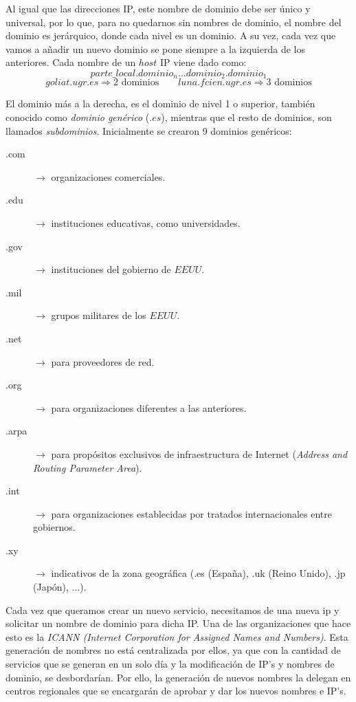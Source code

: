 \documentclass[10pt,a4paper,spanish]{report}
\begin{document}
Al igual que las direcciones IP, este nombre de dominio debe ser único y universal, por lo que, para no quedarnos sin nombres de dominio, el nombre del dominio es jerárquico, donde cada nivel es un dominio. A su vez, cada vez que vamos a añadir un nuevo dominio se pone siempre a la izquierda de los anteriores. Cada nombre de un $host$ IP viene dado como:
\begin{displaymath}
    parte\_local.dominio_n\ldots dominio_2.dominio_1
 \end{displaymath} 
\begin{displaymath} 
   goliat.ugr.es \Rightarrow \text{2 dominios} \qquad luna.fcien.ugr.es \Rightarrow \text{3 dominios}
\end{displaymath} 

El dominio más a la derecha, es el dominio de nivel 1 o superior, también conocido como \textit{\textcolor{tema2}{dominio genérico}} ($.es$), mientras que el resto de dominios, son llamados \textit{\textcolor{tema2}{subdominios}}. Inicialmente se crearon 9 dominios genéricos:
\begin{description}
  \item[.com] $\rightarrow$ organizaciones comerciales.
  \item[.edu] $\rightarrow$ instituciones educativas, como universidades.
  \item[.gov] $\rightarrow$ instituciones del gobierno de $EEUU$.
  \item[.mil] $\rightarrow$ grupos militares de los $EEUU$.
  \item[.net] $\rightarrow$ para proveedores de red.
  \item[.org] $\rightarrow$ para organizaciones diferentes a las anteriores.
  \item[.arpa] $\rightarrow$ para propósitos exclusivos de infraestructura de Internet (\textit{Address and Routing Parameter Area}).
  \item[.int] $\rightarrow$ para organizaciones establecidas por tratados internacionales entre gobiernos.
  \item[.xy] $\rightarrow$ indicativos de la zona geográfica (.es (España), .uk (Reino Unido), .jp (Japón), $\ldots$).
\end{description}

Cada vez que queramos crear un nuevo servicio, necesitamos de una nueva ip y solicitar un nombre de dominio para dicha IP. Una de las organizaciones que hace esto es la \textit{\textcolor{tema2}{ICANN (Internet Corporation for Assigned Names and Numbers)}}. Esta generación de nombres no está centralizada por ellos, ya que con la cantidad de servicios que se generan en un solo día y la modificación de IP's y nombres de dominio, se desbordarían. Por ello, la generación de nuevos nombres la delegan en centros regionales que se encargarán de aprobar y dar los nuevos nombres e IP's.
\end{document}
